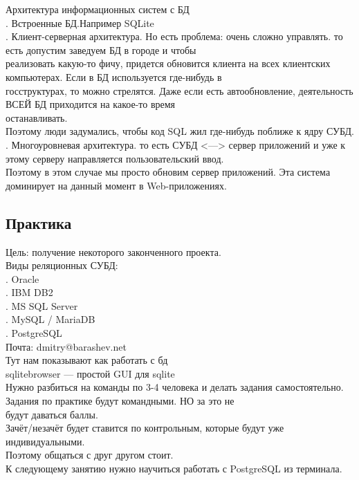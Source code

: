 \noindent Архитектура информационных систем с БД \\
. Встроенные БД.Например SQLite \\
. Клиент-серверная архитектура. Но есть проблема: очень сложно управлять. то есть допустим заведуем БД в городе и чтобы \\
\noindent реализовать какую-то фичу, придется обновится клиента на всех клиентских компьютерах. Если в БД используется где-нибудь в \\
\noindent госструктурах, то можно стрелятся. Даже если есть автообновление, деятельность ВСЕЙ БД приходится на какое-то время \\
\noindent останавливать.  \\
\noindent Поэтому люди задумались, чтобы код SQL жил где-нибудь поближе к ядру СУБД.  \\
. Многоуровневая архитектура. то есть СУБД <—> сервер приложений и уже к этому серверу направляется пользовательский ввод. \\
\noindent Поэтому в этом случае мы просто обновим сервер приложений. Эта система доминирует на данный момент в Web-приложениях. \\



\subsection*{Практика
}
\noindent Цель: получение некоторого законченного проекта. \\

\noindent Виды реляционных СУБД: \\
. Oracle \\
. IBM DB2 \\
. MS SQL Server \\
. MySQL / MariaDB \\
. PostgreSQL  \\

\noindent Почта: dmitry@barashev.net \\

\noindent Тут нам показывают как работать с бд \\
\noindent sqlitebrowser — простой GUI для sqlite \\


\noindent Нужно разбиться на команды по 3-4 человека и делать задания самостоятельно. Задания по практике будут командными. НО за это не \\
\noindent будут даваться баллы. \\
\noindent Зачёт/незачёт будет ставится по контрольным, которые будут уже индивидуальными. \\
\noindent Поэтому общаться с друг другом стоит. \\

\noindent К следующему занятию нужно научиться работать с PostgreSQL из терминала. \\
